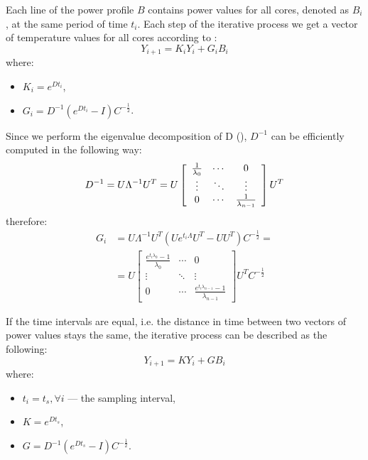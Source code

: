 Each line of the power profile $B$ contains power values for all cores, denoted as $B_i$, at the same period of time $t_i$. Each step of the iterative process we get a vector of temperature values for all cores according to :
\begin{equation} \label{eq:recurrent}
  Y_{i+1} = K_i Y_i + G_i B_i
\end{equation}
where:
\begin{itemize}
  \item $K_i = e^{Dt_i}$,
  \item $G_i = D^{-1}(e^{Dt_i} - I) C^{-\frac{1}{2}}$.
\end{itemize}

Since we perform the eigenvalue decomposition of D (), $D^{-1}$ can be efficiently computed in the following way:
\[
  D^{-1} = U \Lambda^{-1} U^T = U \left[
      \begin{array}{ccc}
        \frac{1}{\lambda_0} & \cdots & 0 \\
        \vdots & \ddots & \vdots \\
        0 & \cdots & \frac{1}{\lambda_{n - 1}}
      \end{array}
    \right] U^T \\
\]
therefore:
\begin{align*}
  G_i & = U \Lambda^{-1} U^T (U e^{t_i \Lambda} U^T - U U^T) C^{-\frac{1}{2}} = \\
      & = U \left[
        \begin{array}{ccc}
          \frac{e^{t_i \lambda_0} - 1}{\lambda_0} & \cdots & 0 \\
          \vdots & \ddots & \vdots \\
          0 & \cdots & \frac{e^{t_i \lambda_{n - 1}} - 1}{\lambda_{n - 1}}
        \end{array}
      \right] U^T C^{-\frac{1}{2}}
\end{align*}

If the time intervals are equal, i.e. the distance in time between two vectors of power values stays the same, the iterative process can be described as the following:
\[
  Y_{i+1} = KY_i + GB_i
\]
where:
\begin{itemize}
  \item $t_i = t_s, \forall i$ --- the sampling interval,
  \item $K = e^{Dt_s}$,
  \item $G = D^{-1}(e^{Dt_s}-I) C^{-\frac{1}{2}}$.
\end{itemize}

